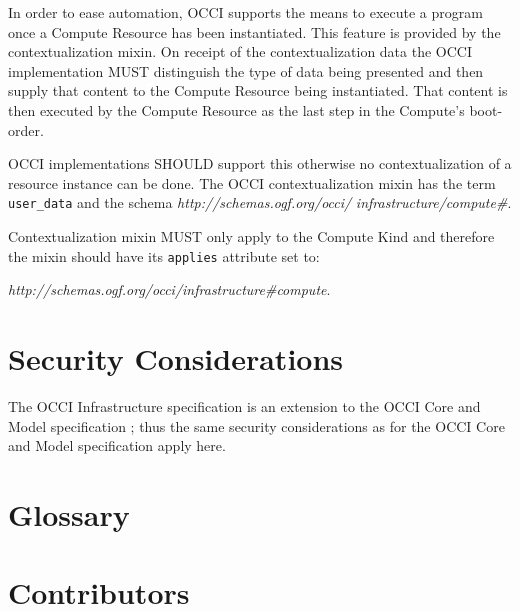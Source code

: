 \documentclass[10pt,a4paper]{article}
\begin{document}
In order to ease automation, OCCI supports the means to execute a
program once a Compute Resource has been instantiated. This feature is
provided by the contextualization mixin. On receipt of the
contextualization data the OCCI implementation MUST distinguish
the type of data being presented and then supply that content to the
Compute Resource being instantiated. That content is then executed
by the Compute Resource as the last step in the Compute's boot-order.

OCCI implementations SHOULD support this otherwise no
contextualization of a resource instance can be done.
The OCCI contextualization mixin has the term \texttt{user\_data}
and the schema \textit{http://schemas.ogf.org/occi/} \textit{infrastructure/compute\#}.

Contextualization mixin MUST only apply to the Compute Kind and therefore
the mixin should have its \texttt{applies} attribute set to:

\textit{http://schemas.ogf.org/occi/infrastructure\#compute}.



\section{Security Considerations}
The OCCI Infrastructure specification is an extension to the OCCI Core
and Model specification \cite{occi:core}; thus the same security
considerations as for the OCCI Core and Model specification apply
here.

\section{Glossary}
\label{sec:glossary}


\section{Contributors}

\end{document}
